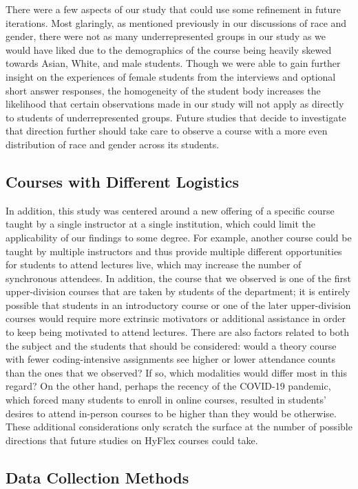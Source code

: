 There were a few aspects of our study that could use some refinement in future iterations. Most glaringly, as mentioned previously in our discussions of race and gender, there were not as many underrepresented groups in our study as we would have liked due to the demographics of the course being heavily skewed towards Asian, White, and male students. Though we were able to gain further insight on the experiences of female students from the interviews and optional short answer responses, the homogeneity of the student body increases the likelihood that certain observations made in our study will not apply as directly to students of underrepresented groups. Future studies that decide to investigate that direction further should take care to observe a course with a more even distribution of race and gender across its students.

\subsection{Courses with Different Logistics}

In addition, this study was centered around a new offering of a specific course taught by a single instructor at a single institution, which could limit the applicability of our findings to some degree. For example, another course could be taught by multiple instructors and thus provide multiple different opportunities for students to attend lectures live, which may increase the number of synchronous attendees. In addition, the course that we observed is one of the first upper-division courses that are taken by students of the department; it is entirely possible that students in an introductory course or one of the later upper-division courses would require more extrinsic motivators or additional assistance in order to keep being motivated to attend lectures. There are also factors related to both the subject and the students that should be considered: would a theory course with fewer coding-intensive assignments see higher or lower attendance counts than the ones that we observed? If so, which modalities would differ most in this regard? On the other hand, perhaps the recency of the COVID-19 pandemic, which forced many students to enroll in online courses, resulted in students' desires to attend in-person courses to be higher than they would be otherwise. These additional considerations only scratch the surface at the number of possible directions that future studies on HyFlex courses could take.

\subsection{Data Collection Methods}

